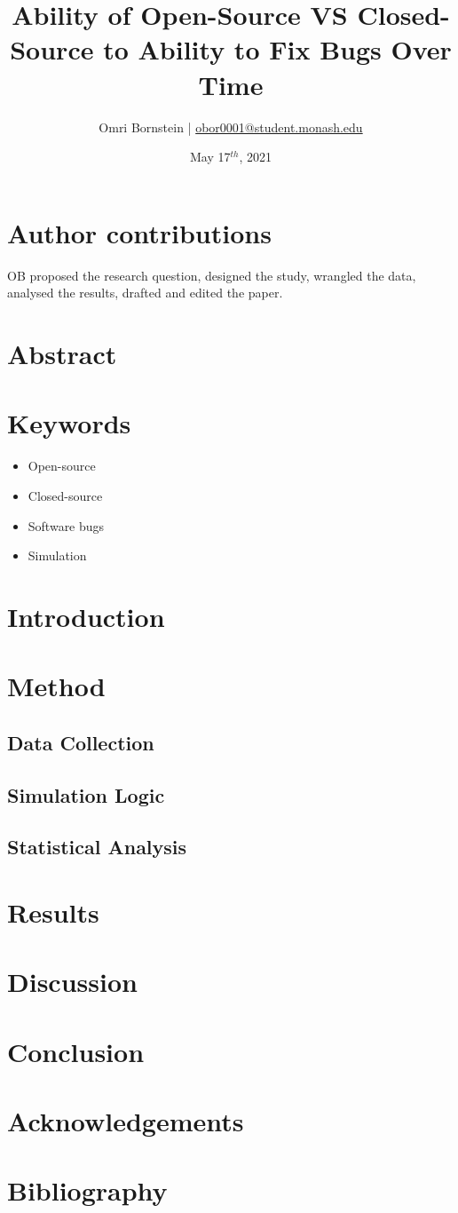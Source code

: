 \documentclass[11pt, a4paper, fleqn]{article}
\title{Ability of Open-Source VS Closed-Source to Ability to Fix Bugs Over Time}
\date{May 17$^{th}$, 2021}
\author{Omri Bornstein | \href{mailto:obor0001@student.monash.edu}{obor0001@student.monash.edu}}
\begin{document}
\maketitle
\section*{Author contributions}
OB proposed the research question, designed the study, wrangled the data, analysed the results, drafted and edited the paper.
\section{Abstract}
\section{Keywords}
\begin{itemize}
	\item Open-source
	\item Closed-source
	\item Software bugs
	\item Simulation
\end{itemize}
\section{Introduction}
\section{Method}
\subsection{Data Collection}
\subsection{Simulation Logic}
\subsection{Statistical Analysis}
\section{Results}
\section{Discussion}
\section{Conclusion}
\section{Acknowledgements}
\section*{Bibliography}
\end{document}
